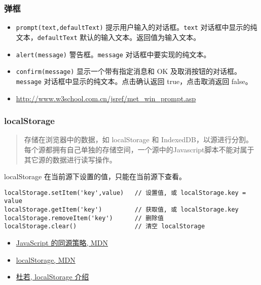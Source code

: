 \subsubsection{弹框}\label{ux5f39ux6846}

\begin{itemize}
\item
  \lstinline!prompt(text,defaultText)!
  提示用户输入的对话框。\lstinline!text!
  对话框中显示的纯文本，\lstinline!defaultText!
  默认的输入文本。返回值为输入文本。
\item
  \lstinline!alert(message)! 警告框。\lstinline!message!
  对话框中要实现的纯文本。
\item
  \lstinline!confirm(message)! 显示一个带有指定消息和 OK
  及取消按钮的对话框。\lstinline!message!
  对话框中显示的纯文本。点击确认返回 true，点击取消返回 false。
\item
  \url{http://www.w3school.com.cn/jsref/met_win_prompt.asp}
\end{itemize}

\subsubsection{localStorage}\label{localstorage}

\begin{quote}
存储在浏览器中的数据，如 localStorage 和
IndexedDB，以源进行分割。每个源都拥有自己单独的存储空间，一个源中的Javascript脚本不能对属于其它源的数据进行读写操作。
\end{quote}

localStorage 在当前源下设置的值，只能在当前源下查看。

\begin{lstlisting}
localStorage.setItem('key',value)   // 设置值, 或 localStorage.key = value
localStorage.getItem('key')         // 获取值, 或 localStorage.key
localStorage.removeItem('key')      // 删除值
localStorage.clear()                // 清空 localStorage
\end{lstlisting}

\begin{itemize}
\tightlist
\item
  \href{https://developer.mozilla.org/zh-CN/docs/Web/Security/Same-origin_policy}{JavaScript
  的同源策略, MDN}
\item
  \href{https://developer.mozilla.org/en-US/docs/Web/API/Storage/LocalStorage}{localStorage,
  MDN}
\item
  \href{http://wikieswan.github.io/javascript/2015/04/03/html5-api-localstorage/}{杜若,
  localStorage 介绍}
\end{itemize}

